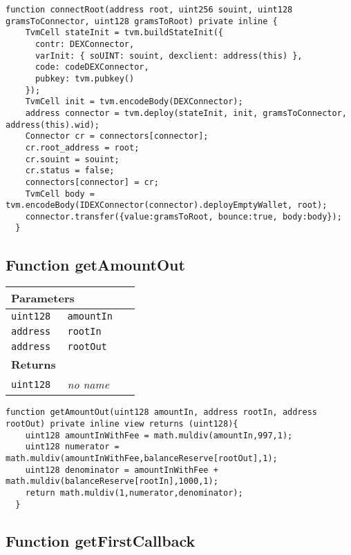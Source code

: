\vspace{2cm}

\begin{lstlisting}[firstnumber=113]
  function connectRoot(address root, uint256 souint, uint128 gramsToConnector, uint128 gramsToRoot) private inline {
    TvmCell stateInit = tvm.buildStateInit({
      contr: DEXConnector,
      varInit: { soUINT: souint, dexclient: address(this) },
      code: codeDEXConnector,
      pubkey: tvm.pubkey()
    });
    TvmCell init = tvm.encodeBody(DEXConnector);
    address connector = tvm.deploy(stateInit, init, gramsToConnector, address(this).wid);
    Connector cr = connectors[connector];
    cr.root_address = root;
    cr.souint = souint;
    cr.status = false;
    connectors[connector] = cr;
    TvmCell body = tvm.encodeBody(IDEXConnector(connector).deployEmptyWallet, root);
    connector.transfer({value:gramsToRoot, bounce:true, body:body});
  }
\end{lstlisting}

\subsection{Function getAmountOut}


\ifsoltables
\noindent\begin{tabular}{|l|l|p{5cm}|}\hline
\multicolumn{3}{|l|}{\bf Parameters}\\\hline
\tt uint128 & \tt amountIn &\\\hline
\tt address & \tt rootIn &\\\hline
\tt address & \tt rootOut &\\\hline
\multicolumn{3}{|l|}{\bf Returns}\\\hline
\tt uint128 & {\em no name} &\\\hline
\end{tabular}
\fi

\vspace{2cm}

\begin{lstlisting}[firstnumber=157]
  function getAmountOut(uint128 amountIn, address rootIn, address rootOut) private inline view returns (uint128){
    uint128 amountInWithFee = math.muldiv(amountIn,997,1);
    uint128 numerator = math.muldiv(amountInWithFee,balanceReserve[rootOut],1);
    uint128 denominator = amountInWithFee + math.muldiv(balanceReserve[rootIn],1000,1);
    return math.muldiv(1,numerator,denominator);
  }
\end{lstlisting}

\subsection{Function getFirstCallback}


